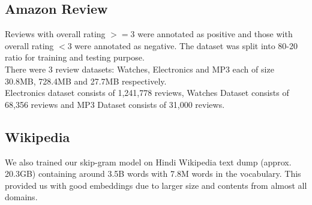 \subsection{Amazon Review}
Reviews with overall rating $>=$3 were annotated as positive and those with overall rating $<$3 were annotated as negative. The dataset was split into 80-20 ratio for training and testing purpose.\\
There were 3 review datasets: Watches, Electronics and MP3 each of size 30.8MB, 728.4MB and 27.7MB respectively.\\
Electronics dataset consists of 1,241,778 reviews, Watches Dataset consists of 68,356 reviews and MP3 Dataset consists of 31,000 reviews.

\subsection{Wikipedia}
We also trained our skip-gram model on Hindi Wikipedia text dump (approx. 20.3GB) containing around 3.5B words with 7.8M words in the vocabulary. This provided us with good embeddings due to larger size and contents from almost all domains.
